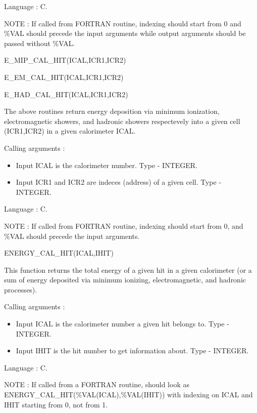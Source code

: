 Language : C.

NOTE : If called from FORTRAN routine, indexing should start from 0 and \%VAL should
precede the input arguments while output arguments should be passed without \%VAL. 

\bigskip

\begin{center}
E\_MIP\_CAL\_HIT(ICAL,ICR1,ICR2)
\end{center}
\begin{center}
E\_EM\_CAL\_HIT(ICAL,ICR1,ICR2)
\end{center}
\begin{center}
E\_HAD\_CAL\_HIT(ICAL,ICR1,ICR2)
\end{center}

The above routines return energy deposition via minimum ionization, electromagnetic showers,
and hadronic showers respectevely into a given cell (ICR1,ICR2) in a given calorimeter ICAL.

Calling arguments :
\begin{itemize}
\item{ Input ICAL is the calorimeter number. Type - INTEGER.}
\item{ Input ICR1 and ICR2 are indeces (address) of a given cell. Type - INTEGER.}
\end{itemize}

Language : C.

NOTE : If called from FORTRAN routine, indexing should start from 0, and \%VAL should
precede the input arguments. 


\newpage
\begin{center}
ENERGY\_CAL\_HIT(ICAL,IHIT)
\end{center}

This function returns the total energy of a given hit in a given calorimeter
(or a sum of energy deposited via minimum ionizing, electromagnetic, and hadronic
processes).

Calling arguments :
\begin{itemize}
\item {Input ICAL is the calorimeter number a given hit belongs to.
Type - INTEGER.}
\item {Input IHIT is the hit number to get information about.
Type - INTEGER.}
\end{itemize}

Language : C.

NOTE : If called from a FORTRAN routine, should look as \\
ENERGY\_CAL\_HIT(\%VAL(ICAL),\%VAL(IHIT)) with indexing on ICAL and IHIT starting
from 0, not from 1.


